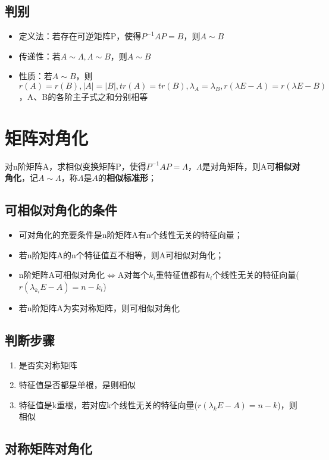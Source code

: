 \subsection{判别}
\begin{itemize}
    \item 定义法：若存在可逆矩阵P，使得\(P^{-1}AP = B\)，则\(A \sim B\)
    \item 传递性：若\(A \sim \Lambda, \Lambda \sim B\)，则\(A \sim B\)
    \item 性质：若\(A \sim B\)，则\(r(A) = r(B), |A| = |B|, tr(A) = tr(B), \lambda_A = \lambda_B, r(\lambda E - A) = r(\lambda E - B)\)，A、B的各阶主子式之和分别相等
\end{itemize}


\section{矩阵对角化}
对n阶矩阵A，求相似变换矩阵P，使得\(P^{-1}AP = \Lambda\)，\(\Lambda\)是对角矩阵，则A可\textbf{相似对角化}，记\(A \sim \Lambda\)，称\(\Lambda\)是\(A\)的\textbf{相似标准形}；

\subsection{可相似对角化的条件}
\begin{itemize}
    \item 可对角化的充要条件是n阶矩阵A有n个线性无关的特征向量；
    \item 若n阶矩阵A的n个特征值互不相等，则A可相似对角化；
    \item n阶矩阵A可相似对角化\(\Leftrightarrow\)A对每个\(k_i\)重特征值都有\(k_i\)个线性无关的特征向量(\(r(\lambda_{k_i}E - A) = n - k_i\))
    \item 若n阶矩阵A为实对称矩阵，则可相似对角化
\end{itemize}

\subsection{判断步骤}
\begin{enumerate}
    \item 是否实对称矩阵
    \item 特征值是否都是单根，是则相似
    \item 特征值是k重根，若对应k个线性无关的特征向量(\(r(\lambda_kE - A) = n - k\))，则相似
\end{enumerate}


\subsection{对称矩阵对角化}
